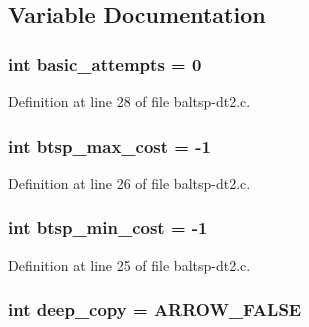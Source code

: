 \subsection{Variable Documentation}
\hypertarget{bin_2baltsp-dt2_8c_227b7ec968925f365b96a92ace419c56}{
\subsubsection[{basic\_\-attempts}]{\setlength{\rightskip}{0pt plus 5cm}int {\bf basic\_\-attempts} = 0}}
\label{bin_2baltsp-dt2_8c_227b7ec968925f365b96a92ace419c56}




Definition at line 28 of file baltsp-dt2.c.\hypertarget{bin_2baltsp-dt2_8c_8135b6557d64f65441d8f07fdc21ffdc}{
\subsubsection[{btsp\_\-max\_\-cost}]{\setlength{\rightskip}{0pt plus 5cm}int {\bf btsp\_\-max\_\-cost} = -1}}
\label{bin_2baltsp-dt2_8c_8135b6557d64f65441d8f07fdc21ffdc}




Definition at line 26 of file baltsp-dt2.c.\hypertarget{bin_2baltsp-dt2_8c_97987334c96a847ff74c2c6c83d78a73}{
\subsubsection[{btsp\_\-min\_\-cost}]{\setlength{\rightskip}{0pt plus 5cm}int {\bf btsp\_\-min\_\-cost} = -1}}
\label{bin_2baltsp-dt2_8c_97987334c96a847ff74c2c6c83d78a73}




Definition at line 25 of file baltsp-dt2.c.\hypertarget{bin_2baltsp-dt2_8c_7298da576a5b127d04b4c46b3bc78821}{
\subsubsection[{deep\_\-copy}]{\setlength{\rightskip}{0pt plus 5cm}int {\bf deep\_\-copy} = ARROW\_\-FALSE}}
\label{bin_2baltsp-dt2_8c_7298da576a5b127d04b4c46b3bc78821}




